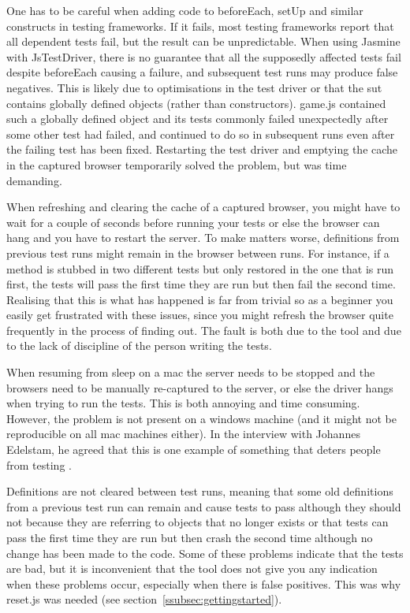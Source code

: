 \documentclass[11pt]{article}
\begin{document}
One has to be careful when adding code to beforeEach, setUp and similar constructs in testing frameworks. If it fails, most testing frameworks report that all dependent tests fail, but the result can be unpredictable. When using Jasmine with JsTestDriver, there is no guarantee that all the supposedly affected tests fail despite beforeEach causing a failure, and subsequent test runs may produce false negatives. This is likely due to optimisations in the test driver or that the \gls{sut} contains globally defined objects (rather than constructors). game.js contained such a globally defined object and its tests commonly failed unexpectedly after some other test had failed, and continued to do so in subsequent runs even after the failing test has been fixed. Restarting the test driver and emptying the cache in the captured browser temporarily solved the problem, but was time demanding.

When refreshing and clearing the cache of a captured browser, you might have to wait for a couple of seconds before running your tests or else the browser can hang and you have to restart the server. To make matters worse, definitions from previous test runs might remain in the browser between runs. For instance, if a method is stubbed in two different tests but only restored in the one that is run first, the tests will pass the first time they are run but then fail the second time. Realising that this is what has happened is far from trivial so as a beginner you easily get frustrated with these issues, since you might refresh the browser quite frequently in the process of finding out. The fault is both due to the tool and due to the lack of discipline of the person writing the tests.

When resuming from sleep on a mac the server needs to be stopped and the browsers need to be manually re-captured to the server, or else the driver hangs when trying to run the tests. This is both annoying and time consuming. However, the problem is not present on a windows machine (and it might not be reproducible on all mac machines either). In the interview with Johannes Edelstam, he agreed that this is one example of something that deters people from testing \cite[question~15]{Edelstam}.

Definitions are not cleared between test runs, meaning that some old definitions from a previous test run can remain and cause tests to pass although they should not because they are referring to objects that no longer exists or that tests can pass the first time they are run but then crash the second time although no change has been made to the code. Some of these problems indicate that the tests are bad, but it is inconvenient that the tool does not give you any indication when these problems occur, especially when there is false positives. This was why reset.js was needed (see section~\ref{ssubsec:gettingstarted}).
\end{document}
